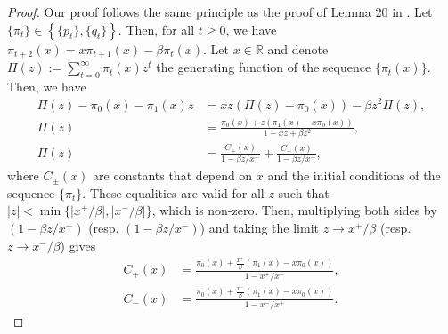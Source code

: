 \documentclass{article}
\theoremstyle{plain}
\theoremstyle{definition}
\theoremstyle{remark}
\begin{document}
\begin{proof}
 Our proof follows the same principle as the proof of Lemma 20 in \cite{xu2018stochastic}. Let $\{\pi_t\} \in \left\{ \{p_t\}, \{q_t\} \right\}$. Then, for all $t\geqslant 0$, we have $\pi_{t+2}(x) = x\pi_{t+1}(x) - \beta\pi_t(x)$. Let $x \in \mathbb{R}$ and denote $\Pi(z) := \sum_{t=0}^\infty \pi_t(x) z^t$ the generating function of the sequence $\{\pi_t(x)\}$. Then, we have
  \begin{align*}
    \Pi(z) - \pi_0(x) - \pi_1(x) z & = xz \left( \Pi(z) - \pi_0(x) \right) - \beta z^2 \Pi(z), \\
    \Pi(z) & = \frac{\pi_0(x) + z(\pi_1(x) - x\pi_0(x))}{1 - xz + \beta z^2}, \\
    \Pi(z) & = \frac{C_+(x)}{1 - \beta z/x^+} + \frac{C_-(x)}{1 - \beta z/x^-}, 
  \end{align*}
  where $C_\pm(x)$ are constants that depend on $x$ and the initial conditions of the sequence $\{\pi_t\}$. These equalities are valid for all $z$ such that $\vert z \vert < \min\{ \vert x^+/\beta \vert, \vert x^-/\beta \vert \}$, which is non-zero. Then, multiplying both sides by $(1 - \beta z/x^+)$ (resp. $(1 - \beta z/x^-)$) and taking the limit $z \to x^+/\beta$ (resp. $z \to x^-/\beta$) gives
  \begin{align*}
    C_+(x) & =  \frac{\pi_0(x) + \frac{x^+}{\beta}(\pi_1(x) - x\pi_0(x))}{1 - x^+ / x^-}, \\
    C_-(x) & = \frac{\pi_0(x) + \frac{x^-}{\beta}(\pi_1(x) - x\pi_0(x))}{1 - x^-/x^+}.
  \end{align*}


\end{proof}
\end{document}
